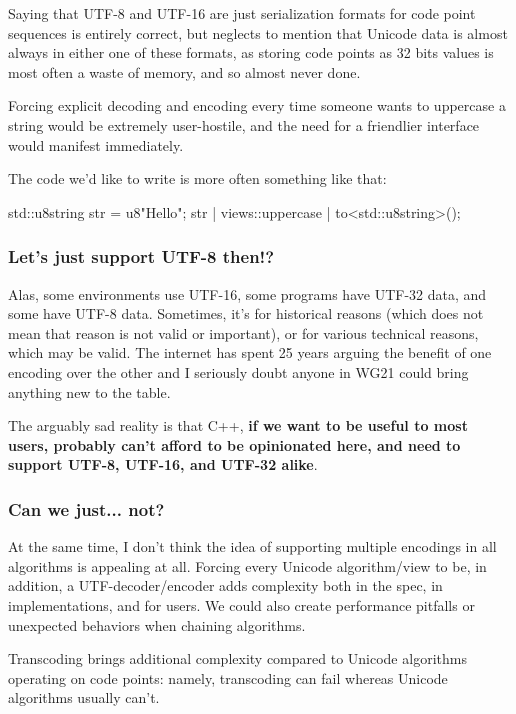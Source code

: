 \documentclass{wg21}
\begin{document}
Saying that UTF-8 and UTF-16 are just serialization formats for code point sequences is entirely correct, but neglects to mention that Unicode data
is almost always in either one of these formats, as storing code points as 32 bits values is most often a waste of memory, and so almost never done.

Forcing explicit decoding and encoding every time someone wants to uppercase a string would be extremely user-hostile, and the need for a friendlier  interface would manifest immediately.

The code we'd like to write is more often something like that:

\begin{colorblock}
std::u8string str = u8"Hello";
str | views::uppercase | to<std::u8string>();
\end{colorblock}

\subsubsection{Let's just support UTF-8 then!?}

Alas, some environments use UTF-16, some programs have UTF-32 data, and some have UTF-8 data.
Sometimes, it's for historical reasons (which does not mean that reason is not valid or important), or for various technical reasons, which may be valid.
The internet has spent 25 years arguing the benefit of one encoding over the other and I seriously doubt anyone in WG21 could bring anything new to the table.

The arguably sad reality is that C++, \textbf{if we want to be useful to most users, probably can't afford to be opinionated here, and need to support UTF-8, UTF-16, and UTF-32 alike}.

\subsubsection{Can we just... not?}

At the same time, I don't think the idea of supporting multiple encodings in all algorithms is appealing at all.
Forcing every Unicode algorithm/view to be, in addition, a UTF-decoder/encoder adds complexity both in the spec, in implementations, and for users.
We could also create performance pitfalls or unexpected behaviors when chaining algorithms.

Transcoding brings additional complexity compared to Unicode algorithms operating on code points:
namely, transcoding can fail whereas Unicode algorithms usually can't.
\end{document}
